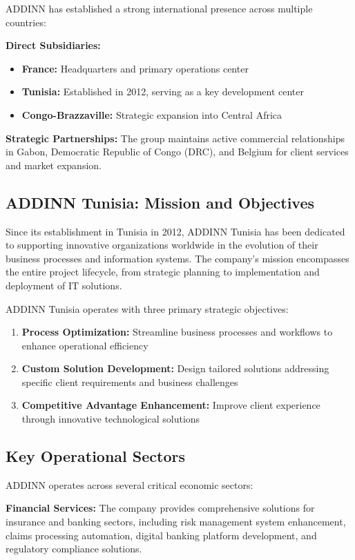 \documentclass[12pt,a4paper]{report}
\begin{document}
ADDINN has established a strong international presence across multiple countries:

\textbf{Direct Subsidiaries:}
\begin{itemize}
    \item \textbf{France:} Headquarters and primary operations center
    \item \textbf{Tunisia:} Established in 2012, serving as a key development center
    \item \textbf{Congo-Brazzaville:} Strategic expansion into Central Africa
\end{itemize}

\textbf{Strategic Partnerships:}
The group maintains active commercial relationships in Gabon, Democratic Republic of Congo (DRC), and Belgium for client services and market expansion.

\subsection{ADDINN Tunisia: Mission and Objectives}

Since its establishment in Tunisia in 2012, ADDINN Tunisia has been dedicated to supporting innovative organizations worldwide in the evolution of their business processes and information systems. The company's mission encompasses the entire project lifecycle, from strategic planning to implementation and deployment of IT solutions.

ADDINN Tunisia operates with three primary strategic objectives:
\begin{enumerate}
    \item \textbf{Process Optimization:} Streamline business processes and workflows to enhance operational efficiency
    \item \textbf{Custom Solution Development:} Design tailored solutions addressing specific client requirements and business challenges
    \item \textbf{Competitive Advantage Enhancement:} Improve client experience through innovative technological solutions
\end{enumerate}

\subsection{Key Operational Sectors}

ADDINN operates across several critical economic sectors:

\textbf{Financial Services:} The company provides comprehensive solutions for insurance and banking sectors, including risk management system enhancement, claims processing automation, digital banking platform development, and regulatory compliance solutions.
\end{document}
